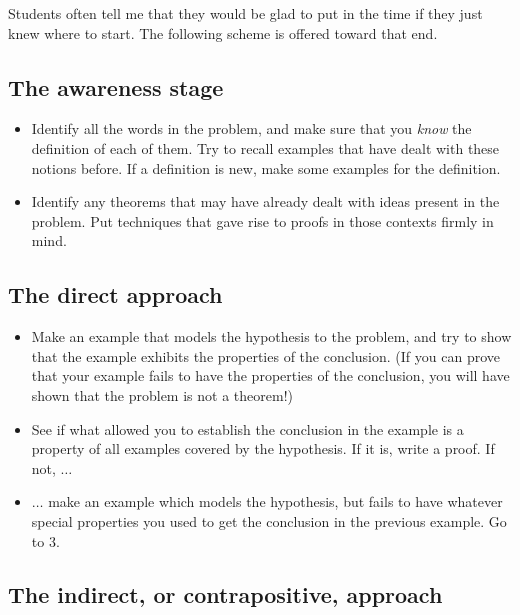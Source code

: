 \documentclass{article}
\begin{document}
Students often tell me that they would be glad to put in the time if they just knew where to start. The following scheme is offered toward that end.

\subsection*{The awareness stage}

\begin{itemize}

  \item[1.] Identify all the words in the problem, and make sure that you \emph{know} the definition of each of them. Try to recall examples that have dealt with these notions before. If a definition is new, make some examples for the definition.

  \item[2.] Identify any theorems that may have already dealt with ideas present in the problem. Put techniques that gave rise to proofs in those contexts firmly in mind.

\end{itemize}

\subsection*{The direct approach}

\begin{itemize}

  \item[3.] Make an example that models the hypothesis to the problem, and try to show that the example exhibits the properties of the conclusion. (If you can prove that your example fails to have the properties of the conclusion, you will have shown that the problem is not a theorem!)

  \item[4.] See if what allowed you to establish the conclusion in the example is a property of all examples covered by the hypothesis. If it is, write a proof. If not, $\ldots$

  \item[5.] $\ldots$ make an example which models the hypothesis, but fails to have whatever special properties you used to get the conclusion in the previous example. Go to 3.

\end{itemize}

\subsection*{The indirect, or contrapositive, approach}
\end{document}
